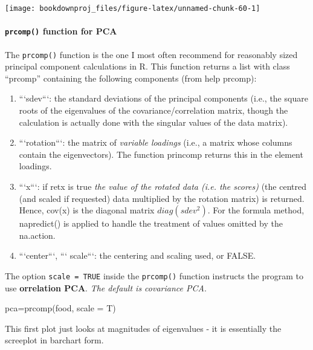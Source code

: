 \documentclass[
]{article}
\newenvironment{Shaded}{\begin{snugshade}}{\end{snugshade}}
\newcommand{\AttributeTok}[1]{\textcolor[rgb]{0.77,0.63,0.00}{#1}}
\newcommand{\FunctionTok}[1]{\textcolor[rgb]{0.00,0.00,0.00}{#1}}
\newcommand{\NormalTok}[1]{#1}
\newcommand{\OtherTok}[1]{\textcolor[rgb]{0.56,0.35,0.01}{#1}}
\theoremstyle{definition}
\theoremstyle{definition}
\theoremstyle{definition}
\theoremstyle{definition}
\theoremstyle{remark}
\begin{document}
\begin{center}\texttt{[image: bookdownproj\_files/figure-latex/unnamed-chunk-60-1]} \end{center}

\hypertarget{prcomp-function-for-pca}{%
\paragraph{\texorpdfstring{\texttt{prcomp()} function for PCA}{prcomp() function for PCA}}\label{prcomp-function-for-pca}}

The \texttt{prcomp()} function is the one I most often recommend for reasonably sized principal component calculations in R. This function returns a list with class ``prcomp'' containing the following components (from help prcomp):

\begin{enumerate}
\item ```sdev```: the standard deviations of the principal components (i.e., the square roots of the eigenvalues of the covariance/correlation matrix, though the calculation is actually done with the singular values of the data matrix).
\item ```rotation```: the matrix of \textit{variable loadings} (i.e., a matrix whose columns contain the eigenvectors). The function princomp returns this in the element loadings.
 \item ```x```:  if retx is true \textit{the value of the rotated data (i.e. the scores)} (the centred (and scaled if requested) data multiplied by the rotation matrix) is returned. Hence, cov(x) is the diagonal matrix $diag(sdev^2)$. For the formula method, napredict() is applied to handle the treatment of values omitted by the na.action.
\item ```center```, ``` scale```: the centering and scaling used, or FALSE.
\end{enumerate}

The option \texttt{scale\ =\ TRUE} inside the \texttt{prcomp()} function instructs the program to use \textbf{orrelation PCA}. \emph{The default is covariance PCA}.

\begin{Shaded}
\begin{Highlighting}[]
\NormalTok{pca}\OtherTok{=}\FunctionTok{prcomp}\NormalTok{(food, }\AttributeTok{scale =}\NormalTok{ T) }
\end{Highlighting}
\end{Shaded}

This first plot just looks at magnitudes of eigenvalues - it is essentially the screeplot in barchart form.
\end{document}
